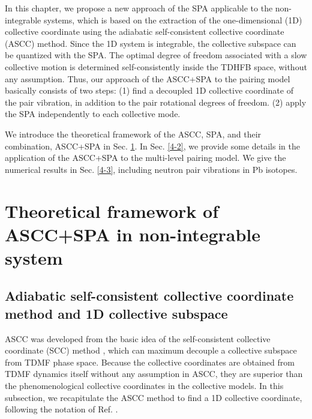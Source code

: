 \documentclass[11pt]{book} %
\begin{document}
In this chapter,
we propose a new approach of the SPA applicable to the non-integrable systems,
which is based on the extraction of the one-dimensional (1D)
collective coordinate
using the adiabatic self-consistent collective coordinate (ASCC) method.
Since the 1D system is integrable,
the collective subspace can be quantized with the SPA.
The optimal degree of freedom associated with a slow collective motion
is determined self-consistently
inside the TDHFB space, without any assumption. 
Thus, our approach of the ASCC+SPA to the pairing model
basically consists of two steps:
(1) find a decoupled 1D collective coordinate of the pair vibration,
in addition to the pair rotational degrees of freedom.
(2) apply the SPA independently to each collective mode.

We introduce the theoretical framework of the ASCC, SPA,
and their combination, ASCC+SPA in Sec. \ref{4-1}. 
In Sec. \ref{4-2}, we provide some details in the application
of the ASCC+SPA to the multi-level pairing model.
We give the numerical results in Sec. \ref{4-3}, including
neutron pair vibrations in Pb isotopes.

\section{Theoretical framework of ASCC+SPA in non-integrable system}
\label{4-1}
\subsection{Adiabatic self-consistent collective coordinate method and
1D collective subspace}
\label{sec:ASCC}
ASCC was developed from the basic idea of the self-consistent collective coordinate (SCC) method \cite{MMSK80}, which can maximum decouple a collective subspace from TDMF phase space.
Because the collective coordinates are obtained from TDMF dynamics itself without any assumption in ASCC, they are superior than the phenomenological collective coordinates in the collective models.
In this subsection,
we recapitulate the ASCC method to find a 1D collective coordinate,
following the notation of Ref. \cite{N2012}.
\end{document}
